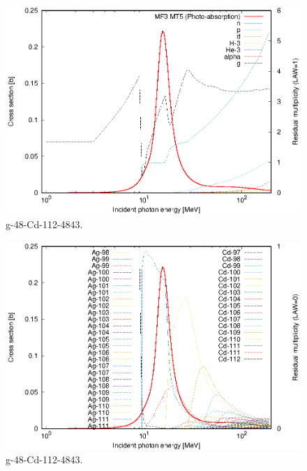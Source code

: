 \begin{figure}
 \includegraphics[width=\linewidth]{eps/g_48-Cd-112_4843.eps}
  \caption{g-48-Cd-112-4843.}
\end{figure}
\begin{figure}
 \includegraphics[width=\linewidth]{eps-law0/g_48-Cd-112_4843.eps}
 \caption{g-48-Cd-112-4843.}
\end{figure}
\newpage \clearpage

